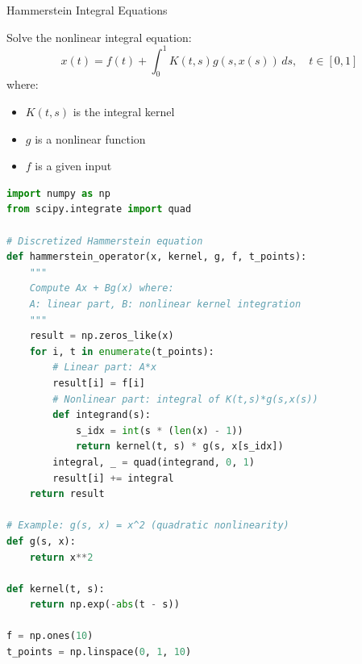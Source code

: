 \documentclass[aspectratio=169,10pt]{beamer}
\begin{document}
\begin{frame}[fragile]{Hammerstein Integral Equations}
    \begin{problem}
        Solve the nonlinear integral equation:
        \[
            x(t) = f(t) + \int_0^1 K(t,s) g(s, x(s)) \, ds, \quad t \in [0,1]
        \]
        where:
        \begin{itemize}
            \item $K(t,s)$ is the integral kernel
            \item $g$ is a nonlinear function
            \item $f$ is a given input
        \end{itemize}
    \end{problem}

    \begin{lstlisting}[language=Python, caption=Numerical solution of Hammerstein equation]
import numpy as np
from scipy.integrate import quad

# Discretized Hammerstein equation
def hammerstein_operator(x, kernel, g, f, t_points):
    """
    Compute Ax + Bg(x) where:
    A: linear part, B: nonlinear kernel integration
    """
    result = np.zeros_like(x)
    for i, t in enumerate(t_points):
        # Linear part: A*x
        result[i] = f[i]
        # Nonlinear part: integral of K(t,s)*g(s,x(s))
        def integrand(s):
            s_idx = int(s * (len(x) - 1))
            return kernel(t, s) * g(s, x[s_idx])
        integral, _ = quad(integrand, 0, 1)
        result[i] += integral
    return result

# Example: g(s, x) = x^2 (quadratic nonlinearity)
def g(s, x):
    return x**2

def kernel(t, s):
    return np.exp(-abs(t - s))

f = np.ones(10)
t_points = np.linspace(0, 1, 10)
    \end{lstlisting}
\end{frame}
\end{document}
